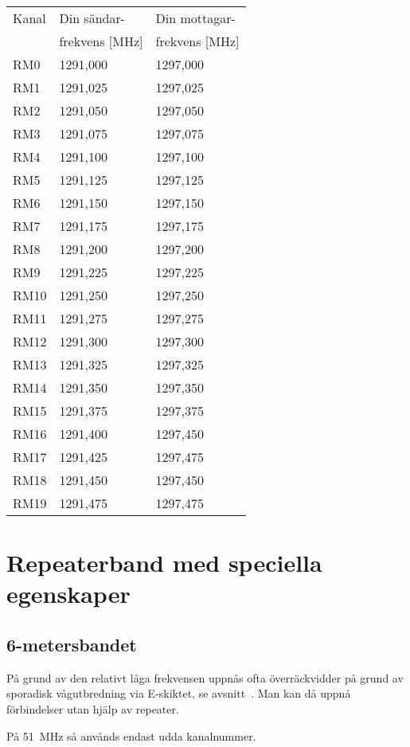 \begin{tabular}{ l | l | l }
	Kanal & Din sändar- & Din mottagar- \\
	& frekvens [\unit{\mega\hertz}] & frekvens [\unit{\mega\hertz}] \\
	\hline
	RM0 & 1291,000 & 1297,000 \\
	RM1 & 1291,025 & 1297,025 \\
	RM2 & 1291,050 & 1297,050 \\
	RM3 & 1291,075 & 1297,075 \\
	RM4 & 1291,100 & 1297,100 \\
	RM5 & 1291,125 & 1297,125 \\
	RM6 & 1291,150 & 1297,150 \\
	RM7 & 1291,175 & 1297,175 \\
	RM8 & 1291,200 & 1297,200 \\
	RM9 & 1291,225 & 1297,225 \\
	RM10 & 1291,250 & 1297,250 \\
	RM11 & 1291,275 & 1297,275 \\
	RM12 & 1291,300 & 1297,300 \\
	RM13 & 1291,325 & 1297,325 \\
	RM14 & 1291,350 & 1297,350 \\
	RM15 & 1291,375 & 1297,375 \\
	RM16 & 1291,400 & 1297,450 \\
	RM17 & 1291,425 & 1297,475 \\
	RM18 & 1291,450 & 1297,450 \\
	RM19 & 1291,475 & 1297,475 \\
\end{tabular}

\newpage

\section[Speciella band]{Repeaterband med speciella egenskaper}
\subsection{6-metersbandet}

På grund av den relativt låga frekvensen uppnås ofta överräckvidder på grund av
sporadisk vågutbredning via E-skiktet, se avsnitt~.
Man kan då uppnå förbindelser utan hjälp av repeater.

På \qty{51}{\mega\hertz} så anvånds endast udda kanalnummer.

